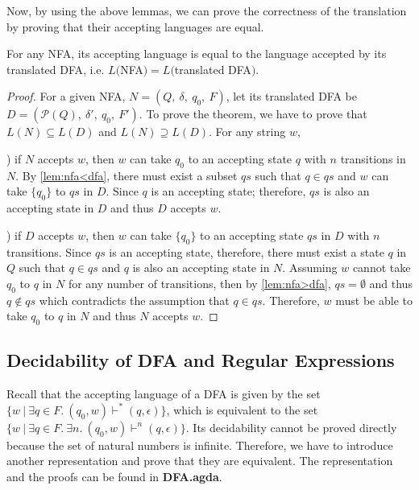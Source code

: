 \par Now, by using the above lemmas, we can prove the correctness of
the translation by proving that their accepting languages are equal. 

\begin{thm}
\noindent For any NFA, its accepting language is equal to
the language accepted by its translated DFA, i.e. \(L(\)NFA\()
= L(\)translated DFA\()\). 
\end{thm}

\begin{proof}
\noindent For a given NFA, \(N = (Q,\ \delta,\ q_0,\ F)\), let its
translated DFA be \(D = (\mathcal P \left({Q}\right),\ \delta',\
{q_0},\ F')\). To
prove the theorem, we have to prove that \(L(N) \subseteq L(D)\) and
\(L(N) \supseteq L(D)\). For any string \(w\), 

\par {}) if \(N\) accepts \(w\), then \(w\) can take \(q_0\) to an
accepting state \(q\) with \(n\) transitions in \(N\). By
\autoref{lem:nfa<dfa}, there must exist a subset \(qs\) such that
\(q \in qs\) and \(w\)
can take \(\{q_0\}\) to \(qs\) in \(D\). Since \(q\) is
an accepting state; therefore, \(qs\) is also an accepting state in
\(D\) and thus \(D\) accepts \(w\). 

\par {}) if \(D\) accepts \(w\), then \(w\) can take
\(\{q_0\}\) to an accepting state \(qs\) in \(D\) with \(n\)
transitions. Since \(qs\) is an accepting state, therefore, there must
exist a state \(q\) in \(Q\) such that \(q \in qs\) and \(q\) is also
an accepting state in \(N\). Assuming \(w\) cannot take \(q_0\) to
\(q\) in \(N\) for any number of transitions, then by
\autoref{lem:nfa>dfa}, \(qs = \emptyset\) and thus \(q \notin qs\) which contradicts the assumption that \(q \in
qs\). Therefore, \(w\) must be able to take \(q_0\) to \(q\) in \(N\) and thus \(N\) accepts \(w\). 
\end{proof}


\subsection{Decidability of DFA and Regular Expressions}
\par Recall that the accepting language of a DFA is given by the set
\(\{w\ |\ \exists q\in F.\ (q_0,w) \vdash^* (q,\epsilon)\}\), which is
equivalent to the set \(\{w\ |\ \exists q\in F.\ \exists n.\ (q_0,w) \vdash^n (q,\epsilon)\}\). 
Its decidability cannot be proved directly because the set of natural
numbers is infinite. Therefore, we have to
introduce another representation and prove
that they are equivalent. The representation and the proofs can be found in \textbf{DFA.agda}. 

